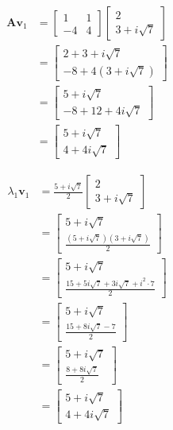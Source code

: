 \documentclass[12pt,a4paper]{article}
\begin{document}
\begin{align}
\bm{A}\bm{v}_1 &= \begin{bmatrix} 1 & 1 \\ -4 & 4 \end{bmatrix} \begin{bmatrix} 2 \\ 3 + i\sqrt{7} \end{bmatrix} \\
&= \begin{bmatrix} 2 + 3 + i\sqrt{7} \\ -8 + 4(3 + i\sqrt{7}) \end{bmatrix} \\
&= \begin{bmatrix} 5 + i\sqrt{7} \\ -8 + 12 + 4i\sqrt{7} \end{bmatrix} \\
&= \begin{bmatrix} 5 + i\sqrt{7} \\ 4 + 4i\sqrt{7} \end{bmatrix}
\end{align}

\begin{align}
\lambda_1 \bm{v}_1 &= \frac{5 + i\sqrt{7}}{2} \begin{bmatrix} 2 \\ 3 + i\sqrt{7} \end{bmatrix} \\
&= \begin{bmatrix} 5 + i\sqrt{7} \\ \frac{(5 + i\sqrt{7})(3 + i\sqrt{7})}{2} \end{bmatrix} \\
&= \begin{bmatrix} 5 + i\sqrt{7} \\ \frac{15 + 5i\sqrt{7} + 3i\sqrt{7} + i^2 \cdot 7}{2} \end{bmatrix} \\
&= \begin{bmatrix} 5 + i\sqrt{7} \\ \frac{15 + 8i\sqrt{7} - 7}{2} \end{bmatrix} \\
&= \begin{bmatrix} 5 + i\sqrt{7} \\ \frac{8 + 8i\sqrt{7}}{2} \end{bmatrix} \\
&= \begin{bmatrix} 5 + i\sqrt{7} \\ 4 + 4i\sqrt{7} \end{bmatrix}
\end{align}
\end{document}
